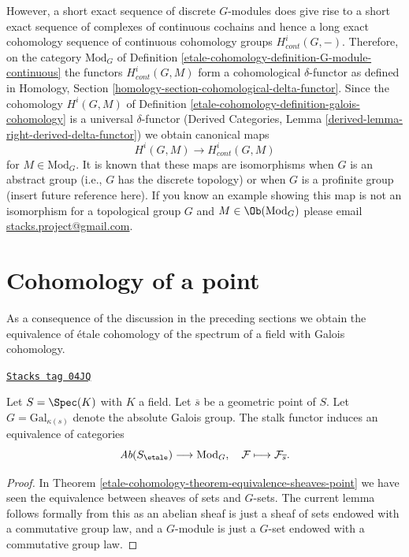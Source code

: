 \medskip\noindent
However, a short exact sequence of discrete $G$-modules does give
rise to a short exact sequence of complexes of continuous cochains
and hence a long exact cohomology sequence of continuous
cohomology groups $H^i_{cont}(G, -)$.
Therefore, on the category $\text{Mod}_G$ of
Definition \ref{etale-cohomology-definition-G-module-continuous} the functors
$H^i_{cont}(G, M)$ form a cohomological $\delta$-functor as defined
in Homology, Section \ref{homology-section-cohomological-delta-functor}.
Since the cohomology $H^i(G, M)$
of Definition \ref{etale-cohomology-definition-galois-cohomology}
is a universal $\delta$-functor
(Derived Categories, Lemma \ref{derived-lemma-right-derived-delta-functor})
we obtain canonical maps
$$
H^i(G, M) \longrightarrow H^i_{cont}(G, M)
$$
for $M \in \text{Mod}_G$. It is known that these maps are
isomorphisms when $G$ is an abstract group (i.e., $G$ has
the discrete topology) or when $G$ is a profinite group
(insert future reference here).
If you know an example showing this map is not an isomorphism
for a topological group $G$ and $M \in \Ob(\text{Mod}_G)$
please email
\href{mailto:stacks.project@gmail.com}{stacks.project@gmail.com}.

\section{Cohomology of a point}
\label{etale-cohomology-section-cohomology-point}
As a consequence of the discussion in the preceding sections
we obtain the equivalence of \'etale cohomology of the spectrum of a
field with Galois cohomology.

\begin{lemma}
\label{etale-cohomology-lemma-equivalence-abelian-sheaves-point}
\href{https://stacks.math.columbia.edu/tag/04JQ}{\texttt{Stacks tag 04JQ}}

Let $S = \Spec(K)$ with $K$ a field.
Let $\overline{s}$ be a geometric point of $S$.
Let $G = \text{Gal}_{\kappa(s)}$ denote the absolute Galois group.
The stalk functor induces an equivalence of categories
$$
\textit{Ab}(S_\etale) \longrightarrow \text{Mod}_G,
\quad
\mathcal{F} \longmapsto \mathcal{F}_{\overline{s}}.
$$
\end{lemma}

\begin{proof}
In
Theorem \ref{etale-cohomology-theorem-equivalence-sheaves-point}
we have seen the equivalence between sheaves of sets and $G$-sets.
The current lemma follows formally from this as an abelian sheaf is just
a sheaf of sets endowed with a commutative group law, and a $G$-module
is just a $G$-set endowed with a commutative group law.
\end{proof}

